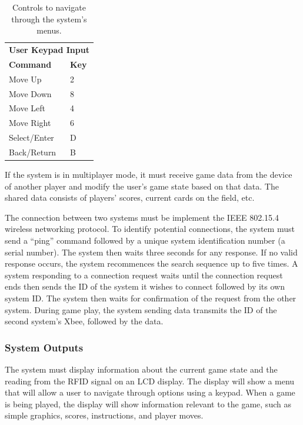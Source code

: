 \documentclass[12pt]{article} %
\begin{document}
\begin{table}[h]
	\begin{tabular}{ll}
		\multicolumn{2}{c}{\textbf{User Keypad Input}} \\
		\textbf{Command}         & \textbf{Key}        \\
		Move Up                  & 2                   \\
		Move Down                & 8                   \\
		Move Left                & 4                   \\
		Move Right               & 6                   \\
		Select/Enter             & D                   \\
		Back/Return              & B                  
	\end{tabular}
	\caption{Controls to navigate through the system's menus.}
	\label{Tab:controlsTable}
\end{table}

If the system is in multiplayer mode, it must receive game data from the device of another player and modify the user's game state based on that data. The shared data consists of players’ scores, current cards on the field, etc.

The connection between two systems must be implement the IEEE 802.15.4 wireless networking protocol. To identify potential connections, the system must send a “ping” command followed by a unique system identification number (a serial number). The system then waits three seconds for any response. If no valid response occurs, the system recommences the search sequence up to five times. A system responding to a connection request waits until the connection request ends then sends the ID of the system it wishes to connect followed by its own system ID. The system then waits for confirmation of the request from the other system. During game play, the system sending data transmits the ID of the second system's Xbee, followed by the data.

\subsubsection{System Outputs}\label{outputs}

The system must display information about the current game state and the reading from the RFID signal on an LCD display.  The display will show a menu that will allow a user to navigate through options using a keypad.  When a game is being played, the display will show information relevant to the game, such as simple graphics, scores, instructions, and player moves.
\end{document}
